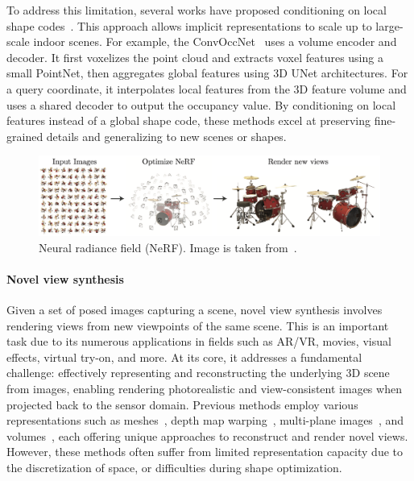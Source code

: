To address this limitation, several works have proposed conditioning on local shape codes~\cite{peng2020convolutional, jiang2020local, genova2020local, chabra2020deep}. This approach allows implicit representations to scale up to large-scale indoor scenes. For example, the ConvOccNet~\cite{peng2020convolutional} uses a volume encoder and decoder. It first voxelizes the point cloud and extracts voxel features using a small PointNet, then aggregates global features using 3D UNet architectures. For a query coordinate, it interpolates local features from the 3D feature volume and uses a shared decoder to output the occupancy value. By conditioning on local features instead of a global shape code, these methods excel at preserving fine-grained details and generalizing to new scenes or shapes.


\begin{figure}[t]
    \centering
    \includegraphics[width=1.0\columnwidth]{imgs/nerf.png}
    \caption{Neural radiance field (NeRF). Image is taken from~\cite{mildenhall2020nerf}.}
    \label{fig:3d_representation}
\end{figure}

\paragraph{Novel view synthesis}
Given a set of posed images capturing a scene, novel view synthesis involves rendering views from new viewpoints of the same scene. This is an important task due to its numerous applications in fields such as AR/VR, movies, visual effects, virtual try-on, and more. At its core, it addresses a fundamental challenge: effectively representing and reconstructing the underlying 3D scene from images, enabling rendering photorealistic and view-consistent images when projected back to the sensor domain. Previous methods employ various representations such as meshes~\cite{buehler2001unstructured,debevec2023modeling}, depth map warping~\cite{chen2023view,shade1998layered}, multi-plane images~\cite{flynn2019deepview,srinivasan2019pushing}, and volumes~\cite{henzler2018single,Lombardi2019,curless1996volumetric}, each offering unique approaches to reconstruct and render novel views. However, these methods often suffer from limited representation capacity due to the discretization of space, or difficulties during shape optimization.

